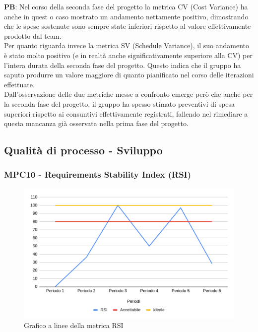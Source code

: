 \documentclass[10pt]{article}
\begin{document}
\begin{justify}
\noindent
\textbf{PB}: Nel corso della seconda fase del progetto la metrica CV (Cost Variance) ha anche in quest o caso mostrato un andamento nettamente positivo, dimostrando
che le spese sostenute sono sempre state inferiori rispetto al valore effettivamente prodotto dal team.\\
Per quanto riguarda invece la metrica SV (Schedule Variance), il suo andamento è stato molto positivo (e in realtà anche significativamente superiore alla CV) per l'intera durata
della seconda fase del progetto. Questo indica che il gruppo ha saputo produrre un valore maggiore di quanto pianificato nel corso delle iterazioni effettuate.\\
Dall'osservazione delle due metriche messe a confronto emerge però che anche per la seconda fase del progetto, il gruppo ha spesso stimato preventivi di spesa superiori
rispetto ai consuntivi effettivamente registrati, fallendo nel rimediare a questa mancanza già osservata nella prima fase del progetto.\\



\subsection{Qualità di processo - Sviluppo}
\subsubsection{MPC10 - Requirements Stability Index (RSI)}%

\begin{figure}[H]
  \centering
  \includegraphics[width=0.9\linewidth]{RSI.png}
  \caption{Grafico a linee della metrica RSI}
  \label{fig:RSIchart}
\end{figure}


\end{justify}
\end{document}
